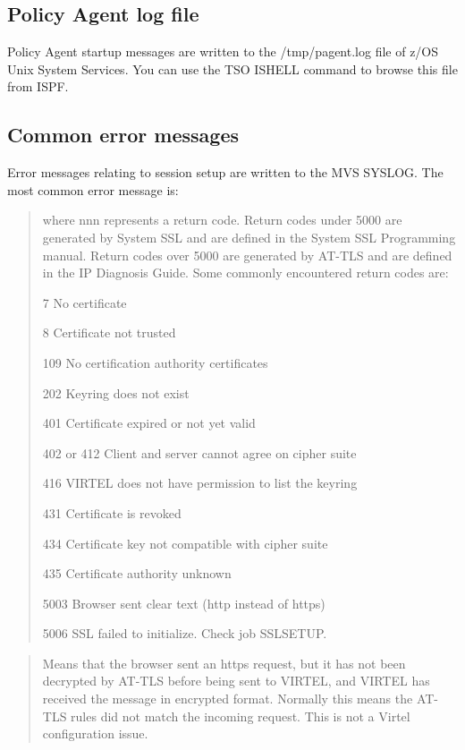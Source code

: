 \documentclass[letterpaper,10pt,english]{sphinxmanual}
\begin{document}
\subsection{Policy Agent log file}
\label{\detokenize{connectivity_guide:policy-agent-log-file}}
Policy Agent startup messages are written to the /tmp/pagent.log file of z/OS Unix System Services. You can use the TSO ISHELL command to browse this file from ISPF.


\subsection{Common error messages}
\label{\detokenize{connectivity_guide:common-error-messages}}
Error messages relating to session setup are written to the MVS SYSLOG. The most common error message is:

\begin{quote}

where nnn represents a return code. Return codes under 5000 are generated by System SSL and are defined in the System SSL Programming manual. Return codes over 5000 are generated by AT-TLS and are defined in the IP Diagnosis Guide. Some commonly encountered return codes are:

7   No certificate

8   Certificate not trusted

109 No certification authority certificates

202 Keyring does not exist

401 Certificate expired or not yet valid

402 or 412 Client and server cannot agree on cipher suite

416 VIRTEL does not have permission to list the keyring

431 Certificate is revoked

434 Certificate key not compatible with cipher suite

435 Certificate authority unknown

5003 Browser sent clear text (http instead of https)

5006 SSL failed to initialize. Check job SSLSETUP.
\end{quote}

\begin{quote}

Means that the browser sent an https request, but it has not been decrypted by AT-TLS before being sent to VIRTEL, and VIRTEL has received the message in encrypted format. Normally this means the AT-TLS rules did not match the incoming request. This is not a Virtel configuration issue.
\end{quote}
\end{document}

